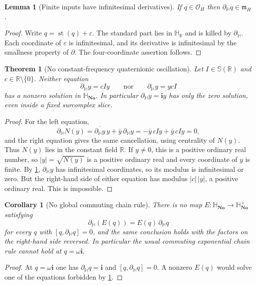 \documentclass[11pt,letterpaper]{article}
\numberwithin{equation}{section}
\newtheorem{theorem}{Theorem}[section]
\newtheorem{lemma}[lemma]{Lemma}
\newtheorem{corollary}[corollary]{Corollary}
\theoremstyle{definition}
\theoremstyle{remark}
\newcommand{\No}{\mathbf{No}}
\newcommand{\SQ}{\mathbb H_{\No}}
\newcommand{\HR}{\mathbb H_{\mathbb R}}
\newcommand{\R}{\mathbb R}
\newcommand{\OO}{\mathcal O}
\newcommand{\mm}{\mathfrak m}
\newcommand{\eps}{\varepsilon}
\newcommand{\ii}{\mathbf i}
\newcommand{\st}{\operatorname{st}}
\newcommand{\abs}[1]{\left|#1\right|}
\newcommand{\dH}{\partial_{\mathbb H}}
\begin{document}
\begin{lemma}[Finite inputs have infinitesimal derivatives]\label{squat:lem:small}
If $q\in\OO_H$ then $\dH q\in\mm_H$.
\end{lemma}
\begin{proof}
Write $q=\st(q)+\eps$. The standard part lies in $\HR$ and is killed by $\dH$. Each
coordinate of $\eps$ is infinitesimal, and its derivative is infinitesimal by the
smallness property of $\partial$. The four-coordinate assertion follows.
\end{proof}

\begin{theorem}[No constant-frequency quaternionic oscillation]\label{squat:thm:nooscillation}
Let $I\in\mathbb S(\R)$ and $c\in\R\setminus\{0\}$. Neither equation
\begin{equation}\label{squat:eq:oscillation}
 \dH y=cIy\qquad\text{nor}\qquad \dH y=ycI
\end{equation}
has a nonzero solution in $\SQ$. In particular $\dH y=\ii y$ has only the zero solution,
even inside a fixed surcomplex slice.
\end{theorem}
\begin{proof}
For the left equation,
\[
 \dH N(y)=\overline{\dH y}\,y+\bar y\,\dH y=-\bar y\,cIy+\bar y\,cIy=0,
\]
and the right equation gives the same cancellation, using centrality of $N(y)$. Thus
$N(y)$ lies in the constant field $\R$. If $y\ne0$, this is a positive ordinary real
number, so $\abs y=\sqrt{N(y)}$ is a positive ordinary real and every coordinate of $y$ is
finite. By \cref{squat:lem:small}, $\dH y$ has infinitesimal coordinates, so its modulus is
infinitesimal or zero. But the right-hand side of either equation has modulus
$\abs c\,\abs y$, a positive ordinary real. This is impossible.
\end{proof}

\begin{corollary}[No global commuting chain rule]\label{squat:cor:nochain}
There is no map $E:\SQ\to\SQ^\times$ satisfying
\[
 \dH(E(q))=E(q)\,\dH q
\]
for every $q$ with $[q,\dH q]=0$, and the same conclusion holds with the factors on the
right-hand side reversed. In particular the usual commuting exponential chain rule cannot
hold at $q=\omega\ii$.
\end{corollary}
\begin{proof}
At $q=\omega\ii$ one has $\dH q=\ii$ and $[q,\dH q]=0$. A nonzero $E(q)$ would solve one of
the equations forbidden by \cref{squat:thm:nooscillation}.
\end{proof}
\end{document}
